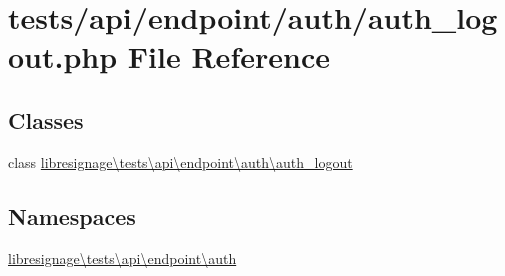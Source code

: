 \hypertarget{tests_2api_2endpoint_2auth_2auth__logout_8php}{}\section{tests/api/endpoint/auth/auth\+\_\+logout.php File Reference}
\label{tests_2api_2endpoint_2auth_2auth__logout_8php}
\subsection*{Classes}
\begin{DoxyCompactItemize}
\item 
class \hyperlink{classlibresignage_1_1tests_1_1api_1_1endpoint_1_1auth_1_1auth__logout}{libresignage\textbackslash{}tests\textbackslash{}api\textbackslash{}endpoint\textbackslash{}auth\textbackslash{}auth\+\_\+logout}
\end{DoxyCompactItemize}
\subsection*{Namespaces}
\begin{DoxyCompactItemize}
\item 
 \hyperlink{namespacelibresignage_1_1tests_1_1api_1_1endpoint_1_1auth}{libresignage\textbackslash{}tests\textbackslash{}api\textbackslash{}endpoint\textbackslash{}auth}
\end{DoxyCompactItemize}
